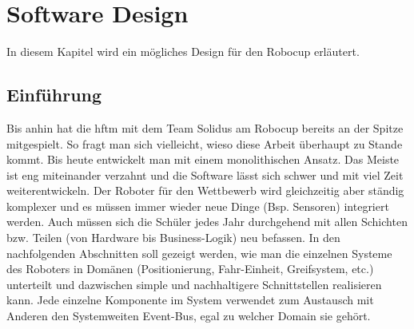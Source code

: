 \chapter{Software Design}
In diesem Kapitel wird ein mögliches Design für den Robocup erläutert.
\section{Einführung}
Bis anhin hat die \acrshort{hftm} mit dem Team Solidus am Robocup bereits an der Spitze mitgespielt. So fragt man sich vielleicht, wieso diese Arbeit überhaupt zu Stande kommt. Bis heute entwickelt man mit einem monolithischen Ansatz. Das Meiste ist eng miteinander verzahnt und die Software lässt sich schwer und mit viel Zeit weiterentwickeln. Der Roboter für den Wettbewerb wird gleichzeitig aber ständig komplexer und es müssen immer wieder neue Dinge (Bsp. Sensoren) integriert werden. Auch müssen sich die Schüler jedes Jahr durchgehend mit allen Schichten bzw. Teilen (von Hardware bis Business-Logik) neu befassen. In den nachfolgenden Abschnitten soll gezeigt werden, wie man die einzelnen Systeme des Roboters in Domänen (Positionierung, Fahr-Einheit, Greifsystem, etc.) unterteilt und dazwischen simple und nachhaltigere Schnittstellen realisieren kann.
Jede einzelne Komponente im System verwendet zum Austausch mit Anderen den Systemweiten Event-Bus, egal zu welcher Domain sie gehört.


